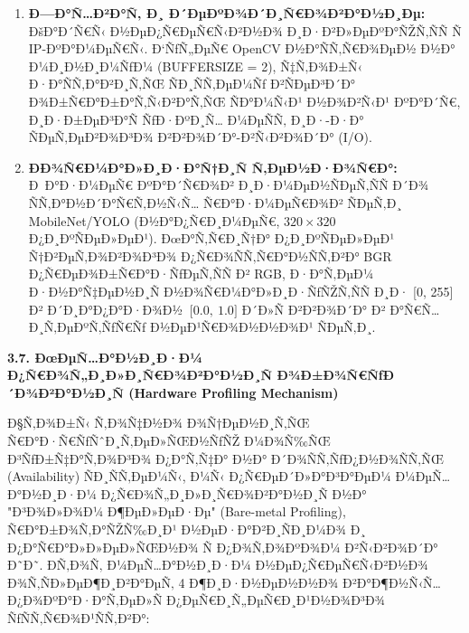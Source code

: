 \documentclass[]{article}
\begin{document}
\begin{enumerate}
\def\labelenumi{\arabic{enumi}.}
\item
  \textbf{Ð—Ð°Ñ…Ð²Ð°Ñ‚ Ð¸ Ð´ÐµÐºÐ¾Ð´Ð¸Ñ€Ð¾Ð²Ð°Ð½Ð¸Ðµ:} ÐšÐ°Ð´Ñ€Ñ‹ Ð½ÐµÐ¿Ñ€ÐµÑ€Ñ‹Ð²Ð½Ð¾ Ð¸Ð·Ð²Ð»ÐµÐºÐ°ÑŽÑ‚ÑÑ Ñ IP-ÐºÐ°Ð¼ÐµÑ€Ñ‹. Ð‘ÑƒÑ„ÐµÑ€ OpenCV Ð½Ð°ÑÑ‚Ñ€Ð¾ÐµÐ½ Ð½Ð° Ð¼Ð¸Ð½Ð¸Ð¼ÑƒÐ¼ (BUFFERSIZE = 2), Ñ‡Ñ‚Ð¾Ð±Ñ‹ Ð·Ð°ÑÑ‚Ð°Ð²Ð¸Ñ‚ÑŒ ÑÐ¸ÑÑ‚ÐµÐ¼Ñƒ Ð²ÑÐµÐ³Ð´Ð° Ð¾Ð±Ñ€Ð°Ð±Ð°Ñ‚Ñ‹Ð²Ð°Ñ‚ÑŒ ÑÐ°Ð¼Ñ‹Ð¹ Ð½Ð¾Ð²Ñ‹Ð¹ ÐºÐ°Ð´Ñ€, Ð¸Ð·Ð±ÐµÐ³Ð°Ñ ÑƒÐ·ÐºÐ¸Ñ… Ð¼ÐµÑÑ‚ Ð¸Ð·-Ð·Ð° ÑÐµÑ‚ÐµÐ²Ð¾Ð³Ð¾ Ð²Ð²Ð¾Ð´Ð°-Ð²Ñ‹Ð²Ð¾Ð´Ð° (I/O).
\item
  \textbf{ÐÐ¾Ñ€Ð¼Ð°Ð»Ð¸Ð·Ð°Ñ†Ð¸Ñ Ñ‚ÐµÐ½Ð·Ð¾Ñ€Ð°:} Ð Ð°Ð·Ð¼ÐµÑ€ ÐºÐ°Ð´Ñ€Ð¾Ð² Ð¸Ð·Ð¼ÐµÐ½ÑÐµÑ‚ÑÑ Ð´Ð¾ ÑÑ‚Ð°Ð½Ð´Ð°Ñ€Ñ‚Ð½Ñ‹Ñ… Ñ€Ð°Ð·Ð¼ÐµÑ€Ð¾Ð² ÑÐµÑ‚Ð¸ MobileNet/YOLO (Ð½Ð°Ð¿Ñ€Ð¸Ð¼ÐµÑ€, \(320 \times 320\) Ð¿Ð¸ÐºÑÐµÐ»ÐµÐ¹). ÐœÐ°Ñ‚Ñ€Ð¸Ñ†Ð° Ð¿Ð¸ÐºÑÐµÐ»ÐµÐ¹ Ñ†Ð²ÐµÑ‚Ð¾Ð²Ð¾Ð³Ð¾ Ð¿Ñ€Ð¾ÑÑ‚Ñ€Ð°Ð½ÑÑ‚Ð²Ð° BGR Ð¿Ñ€ÐµÐ¾Ð±Ñ€Ð°Ð·ÑƒÐµÑ‚ÑÑ Ð² RGB, Ð·Ð°Ñ‚ÐµÐ¼ Ð·Ð½Ð°Ñ‡ÐµÐ½Ð¸Ñ Ð½Ð¾Ñ€Ð¼Ð°Ð»Ð¸Ð·ÑƒÑŽÑ‚ÑÑ Ð¸Ð· {[}0, 255{]} Ð² Ð´Ð¸Ð°Ð¿Ð°Ð·Ð¾Ð½ \(\ \lbrack 0.0,\ 1.0\rbrack\) Ð´Ð»Ñ Ð²Ð²Ð¾Ð´Ð° Ð² Ð°Ñ€Ñ…Ð¸Ñ‚ÐµÐºÑ‚ÑƒÑ€Ñƒ Ð½ÐµÐ¹Ñ€Ð¾Ð½Ð½Ð¾Ð¹ ÑÐµÑ‚Ð¸.
\end{enumerate}

\textbf{3.7. ÐœÐµÑ…Ð°Ð½Ð¸Ð·Ð¼ Ð¿Ñ€Ð¾Ñ„Ð¸Ð»Ð¸Ñ€Ð¾Ð²Ð°Ð½Ð¸Ñ Ð¾Ð±Ð¾Ñ€ÑƒÐ´Ð¾Ð²Ð°Ð½Ð¸Ñ (Hardware Profiling Mechanism)}

Ð§Ñ‚Ð¾Ð±Ñ‹ Ñ‚Ð¾Ñ‡Ð½Ð¾ Ð¾Ñ†ÐµÐ½Ð¸Ñ‚ÑŒ Ñ€Ð°Ð·Ñ€ÑƒÑˆÐ¸Ñ‚ÐµÐ»ÑŒÐ½ÑƒÑŽ Ð¼Ð¾Ñ‰ÑŒ Ð³ÑƒÐ±Ñ‡Ð°Ñ‚Ð¾Ð³Ð¾ Ð¿Ð°Ñ‚Ñ‡Ð° Ð½Ð° Ð´Ð¾ÑÑ‚ÑƒÐ¿Ð½Ð¾ÑÑ‚ÑŒ (Availability) ÑÐ¸ÑÑ‚ÐµÐ¼Ñ‹, Ð¼Ñ‹ Ð¿Ñ€ÐµÐ´Ð»Ð°Ð³Ð°ÐµÐ¼ Ð¼ÐµÑ…Ð°Ð½Ð¸Ð·Ð¼ Ð¿Ñ€Ð¾Ñ„Ð¸Ð»Ð¸Ñ€Ð¾Ð²Ð°Ð½Ð¸Ñ Ð½Ð° "Ð³Ð¾Ð»Ð¾Ð¼ Ð¶ÐµÐ»ÐµÐ·Ðµ" (Bare-metal Profiling), Ñ€Ð°Ð±Ð¾Ñ‚Ð°ÑŽÑ‰Ð¸Ð¹ Ð½ÐµÐ·Ð°Ð²Ð¸ÑÐ¸Ð¼Ð¾ Ð¸ Ð¿Ð°Ñ€Ð°Ð»Ð»ÐµÐ»ÑŒÐ½Ð¾ Ñ Ð¿Ð¾Ñ‚Ð¾ÐºÐ¾Ð¼ Ð²Ñ‹Ð²Ð¾Ð´Ð° Ð˜Ð˜. Ð­Ñ‚Ð¾Ñ‚ Ð¼ÐµÑ…Ð°Ð½Ð¸Ð·Ð¼ Ð½ÐµÐ¿Ñ€ÐµÑ€Ñ‹Ð²Ð½Ð¾ Ð¾Ñ‚ÑÐ»ÐµÐ¶Ð¸Ð²Ð°ÐµÑ‚ 4 Ð¶Ð¸Ð·Ð½ÐµÐ½Ð½Ð¾ Ð²Ð°Ð¶Ð½Ñ‹Ñ… Ð¿Ð¾ÐºÐ°Ð·Ð°Ñ‚ÐµÐ»Ñ Ð¿ÐµÑ€Ð¸Ñ„ÐµÑ€Ð¸Ð¹Ð½Ð¾Ð³Ð¾ ÑƒÑÑ‚Ñ€Ð¾Ð¹ÑÑ‚Ð²Ð°:
\end{document}
